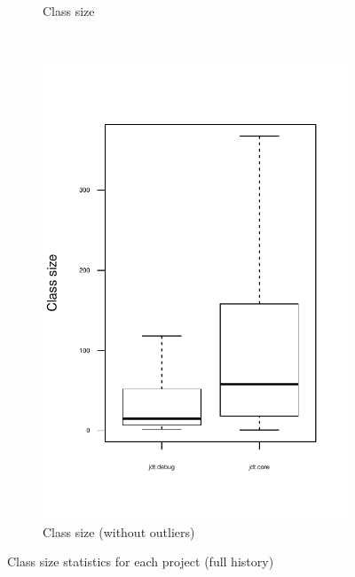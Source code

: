 \begin{figure}
\begin{subfigure}[b]{0.48\textwidth}
                \caption{Class size}
        \end{subfigure}%
        ~ %
        \begin{subfigure}[b]{0.48\textwidth}
                \centering
                \includegraphics[width=\textwidth]{img/class-size-boxplot-zoomed.pdf}
                \caption{Class size (without outliers)}
        \end{subfigure}
		\caption{Class size statistics for each project (full history)}
		\label{fig:class-stats}
\end{figure}

